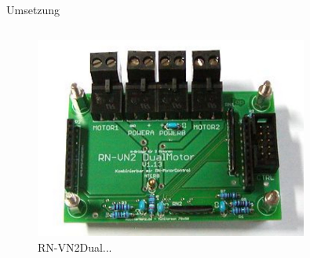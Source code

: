 \documentclass{beamer}
\begin{document}
\begin{frame}{Umsetzung}
\begin{columns}
\begin{column}{0.3\textwidth}
\begin{figure}
		\centering
		\includegraphics[width=0.8\textwidth]{./images/rn-vnh2dualmotor.jpg}
		\caption{RN-VN2Dual...\cite{Image:RNVN2DualMotor}}
	\end{figure}
	\end{column}
\end{columns}
\end{frame}
\end{document}
